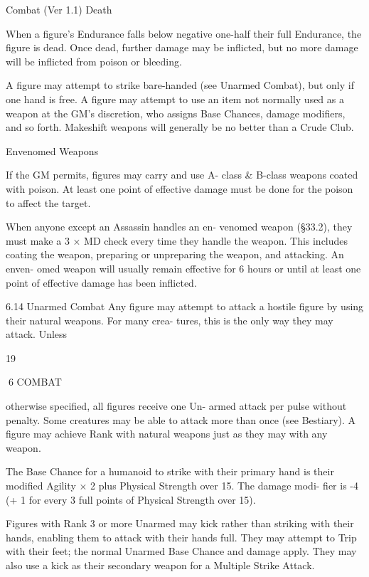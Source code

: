 \begin{Chapter}{Combat (Ver 1.1)}
Death 

When  a  figure’s  Endurance  falls  below  negative 
one-half  their  full  Endurance,  the  figure  is  dead. 
Once dead, further damage may be inflicted, but no 
more  damage  will  be  inflicted  from  poison  or 
bleeding. 

A  figure  may  attempt  to  strike  bare-handed  (see 
Unarmed Combat), but only if one hand is free.  A 
figure  may  attempt  to  use  an  item  not  normally 
used  as  a  weapon  at  the  GM’s  discretion,  who 
assigns  Base  Chances,  damage  modifiers,  and  so 
forth.  Makeshift  weapons  will  generally  be  no 
better than a Crude Club. 

Envenomed Weapons 

If  the  GM  permits,  figures  may  carry  and  use  A-
class  \&  B-class  weapons  coated  with  poison.  At 
least  one  point  of  effective  damage  must  be  done 
for the poison to affect the target. 

When  anyone  except  an  Assassin  handles  an  en-
venomed  weapon  (§33.2),  they  must  make  a  3  × 
MD  check  every  time  they  handle  the  weapon. 
This  includes  coating  the  weapon,  preparing  or 
unpreparing the weapon, and attacking. An enven-
omed  weapon  will  usually  remain  effective  for  6 
hours or until at least one point of effective damage 
has been inflicted. 

6.14 Unarmed Combat 
Any  figure  may  attempt  to  attack  a  hostile  figure 
by  using  their  natural  weapons.  For  many  crea-
tures, this is the only way they may attack. Unless 

19 

6 COMBAT 

otherwise  specified,  all  figures  receive  one  Un-
armed  attack  per  pulse  without  penalty.  Some 
creatures may be able to attack more than once (see 
Bestiary). A figure may achieve Rank with natural 
weapons just as they may with any weapon. 

The  Base  Chance  for  a  humanoid  to  strike  with 
their  primary  hand  is  their  modified  Agility  ×  2 
plus Physical Strength over 15. The damage modi-
fier  is  -4  (+  1  for  every  3  full  points  of  Physical 
Strength over 15). 

Figures  with  Rank  3  or  more  Unarmed  may  kick 
rather than striking with their hands, enabling them 
to attack with their hands full. They may attempt to 
Trip  with  their  feet;  the  normal  Unarmed  Base 
Chance  and  damage  apply.  They  may  also  use  a 
kick  as  their  secondary  weapon  for  a  Multiple 
Strike Attack. 


\end{Chapter}
